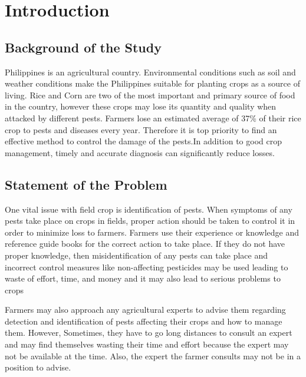 \documentclass[journal]{./IEEE/IEEEtran}
\title{\SPTITLE}
\author{\ADVISEE~and~\ADVISER%
\REMARK
}
\begin{document}
\maketitle

\section{Introduction}

\subsection{Background of the Study}
Philippines is an agricultural country. Environmental conditions such as soil and weather conditions make the Philippines suitable for planting crops as a source of living. Rice and Corn are two of the most important and primary source of food in the country, however these crops may lose its quantity and quality when attacked by different pests. Farmers lose an estimated average of 37\% of their rice crop to pests and diseases every year. Therefore it is top priority to find an effective method to control the damage of the pests.In addition to good crop management, timely and accurate diagnosis can significantly reduce losses.\cite{electronic_irri}

\subsection{Statement of the Problem}
One vital issue with field crop is identification of pests. When symptoms of any pests take place on crops in fields, proper action should be taken to control it in order to minimize loss to farmers. Farmers use their experience or knowledge and reference guide books for the correct action to take place. If they do not have proper knowledge, then misidentification of any pests can take place and incorrect control measures like non-affecting pesticides may be used leading to waste of effort, time, and money and it may also lead to serious problems to crops
	
Farmers may also approach any agricultural experts to advise them regarding detection and identification of pests affecting their crops and how to manage them. However, Sometimes, they have to go long distances to consult an expert and may find themselves wasting their time and effort because the expert may not be available at the time. Also, the expert the farmer consults may not be in a position to advise.
	
\end{document}
